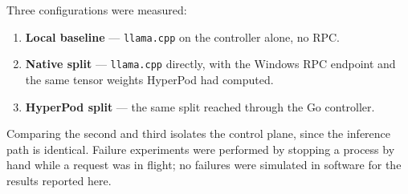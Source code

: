 Three configurations were measured:

\begin{enumerate}[leftmargin=1.4em,itemsep=2pt]
  \item \textbf{Local baseline} --- \texttt{llama.cpp} on the controller alone,
        no RPC.
  \item \textbf{Native split} --- \texttt{llama.cpp} directly, with the Windows
        RPC endpoint and the same tensor weights HyperPod had computed.
  \item \textbf{HyperPod split} --- the same split reached through the Go
        controller.
\end{enumerate}

Comparing the second and third isolates the control plane, since the inference
path is identical. Failure experiments were performed by stopping a
 process by hand while a request was in flight; no
failures were simulated in software for the results reported here.
